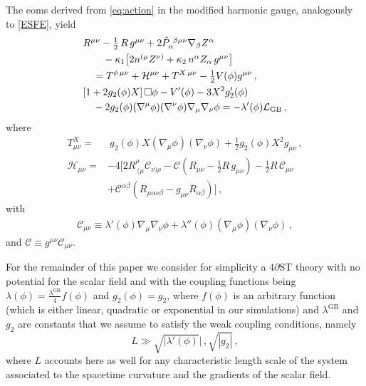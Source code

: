 \documentclass[reprint,aps,amsmath,amssymb,twoside,prd,showkeys,superscriptaddress,nofootinbib]{revtex4-2}
\begin{document}
The eoms derived from \eqref{eq:action} in the modified harmonic gauge, analogously to \eqref{ESFE}, yield
\begin{align}
&\textstyle R^{\mu\nu}-\frac{1}{2}\, R \,g^{\mu\nu}+2\hat{P}_{\alpha}^{~\beta\mu\nu}\nabla_{\beta}Z^{\alpha} \nonumber\\
&\hspace{0.7cm}-\kappa_1\textstyle\big[2n^{(\mu}Z^{\nu)}+\kappa_2\,n^{\alpha}Z_{\alpha}\,g^{\mu\nu}\big] \nonumber \\
&\hspace{0.35cm}= T^{\phi\,\mu\nu} +{\mathcal H}^{\mu\nu} 
+T^{X\,\mu\nu} -\tfrac{1}{2}V(\phi)g^{\mu\nu}\,, \label{eq:eom_metric} \\
&[1+2g_2(\phi)X]\,\Box \phi -V'(\phi)-3X^2g_2'(\phi) \, \nonumber\\
&\hspace{0.35cm}- 2g_2(\phi)(\nabla^{\mu}\phi)(\nabla^{\nu}\phi)\nabla_{\mu}\nabla_{\nu}\phi = -\lambda'(\phi){\mathcal L}_{\text{GB}} \,, \label{eq:eom_sf}
\end{align}
where
\begin{align}
    T^X_{\mu\nu}=&~\textstyle g_2(\phi)X(\nabla_{\mu}\phi)(\nabla_{\nu}\phi)+\tfrac{1}{2}g_2(\phi)X^2g_{\mu\nu}\,, \\
    {\mathcal H}_{\mu\nu}= &\textstyle -4\big[2R^{\rho}_ {~(\mu}{\mathcal C}_{\nu)\rho}-{\mathcal C}(R_{\mu\nu}-\frac{1}{2}R\,g_{\mu\nu})-\frac{1}{2}R\,{\mathcal C}_{\mu\nu}\,\nonumber\\&+{\mathcal C}^{\alpha\beta}\left(R_{\mu\alpha\nu\beta}-g_{\mu\nu}R_{\alpha\beta}\right)\big]\, ,
\end{align}
with 
\begin{align}\label{Cmunu}
    {\mathcal C}_{\mu\nu}\equiv\lambda'(\phi)\nabla_{\mu}\nabla_{\nu}\phi+\lambda''(\phi)(\nabla_{\mu}\phi)(\nabla_{\nu}\phi)\,,
\end{align}
and ${\mathcal C}\equiv g^{\mu\nu}\mathcal{C}_{\mu\nu}$.

For the remainder of this paper we consider for simplicity a $4\partial$ST theory with no potential for the scalar field and with the coupling functions being $\lambda(\phi)=\tfrac{\lambda^{\text{GB}}}{4}f(\phi)$ and $g_2(\phi)=g_2$, where $f(\phi)$ is an arbitrary function (which is either linear, quadratic or exponential in our simulations) and $\lambda^{\text{GB}}$ and $g_2$ are constants that we assume to satisfy the weak coupling conditions, namely 
\begin{equation}
    L\gg \sqrt{|\lambda'(\phi)}|\,,\sqrt{|g_2|}\,,
\end{equation}
where $L$ accounts here as well for any characteristic length scale of the system associated to the spacetime curvature and the gradients of the scalar field.
\end{document}
